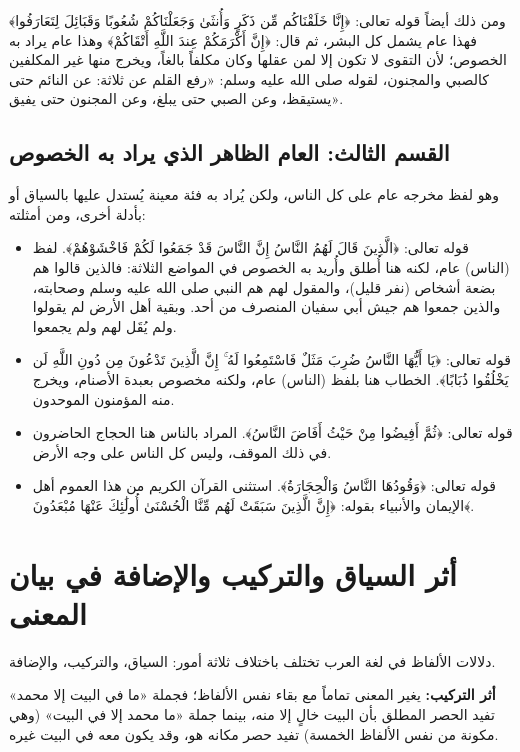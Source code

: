 ومن ذلك أيضاً قوله تعالى: ﴿إِنَّا خَلَقْنَاكُم مِّن ذَكَرٍ وَأُنثَىٰ وَجَعَلْنَاكُمْ شُعُوبًا وَقَبَائِلَ لِتَعَارَفُوا﴾ فهذا عام يشمل كل البشر، ثم قال: ﴿إِنَّ أَكْرَمَكُمْ عِندَ اللَّهِ أَتْقَاكُمْ﴾ وهذا عام يراد به الخصوص؛ لأن التقوى لا تكون إلا لمن عقلها وكان مكلفاً بالغاً، ويخرج منها غير المكلفين كالصبي والمجنون، لقوله صلى الله عليه وسلم: «رفع القلم عن ثلاثة: عن النائم حتى يستيقظ، وعن الصبي حتى يبلغ، وعن المجنون حتى يفيق».

\subsection{القسم الثالث: العام الظاهر الذي يراد به الخصوص}
وهو لفظ مخرجه عام على كل الناس، ولكن يُراد به فئة معينة يُستدل عليها بالسياق أو بأدلة أخرى، ومن أمثلته:
\begin{itemize}
    \item قوله تعالى: ﴿الَّذِينَ قَالَ لَهُمُ النَّاسُ إِنَّ النَّاسَ قَدْ جَمَعُوا لَكُمْ فَاخْشَوْهُمْ﴾. لفظ (الناس) عام، لكنه هنا أُطلق وأُريد به الخصوص في المواضع الثلاثة: فالذين قالوا هم بضعة أشخاص (نفر قليل)، والمقول لهم هم النبي صلى الله عليه وسلم وصحابته، والذين جمعوا هم جيش أبي سفيان المنصرف من أحد. وبقية أهل الأرض لم يقولوا ولم يُقَل لهم ولم يجمعوا.
    \item قوله تعالى: ﴿يَا أَيُّهَا النَّاسُ ضُرِبَ مَثَلٌ فَاسْتَمِعُوا لَهُ ۚ إِنَّ الَّذِينَ تَدْعُونَ مِن دُونِ اللَّهِ لَن يَخْلُقُوا ذُبَابًا﴾. الخطاب هنا بلفظ (الناس) عام، ولكنه مخصوص بعبدة الأصنام، ويخرج منه المؤمنون الموحدون.
    \item قوله تعالى: ﴿ثُمَّ أَفِيضُوا مِنْ حَيْثُ أَفَاضَ النَّاسُ﴾. المراد بالناس هنا الحجاج الحاضرون في ذلك الموقف، وليس كل الناس على وجه الأرض.
    \item قوله تعالى: ﴿وَقُودُهَا النَّاسُ وَالْحِجَارَةُ﴾. استثنى القرآن الكريم من هذا العموم أهل الإيمان والأنبياء بقوله: ﴿إِنَّ الَّذِينَ سَبَقَتْ لَهُم مِّنَّا الْحُسْنَىٰ أُولَٰئِكَ عَنْهَا مُبْعَدُونَ﴾.
\end{itemize}

\section{أثر السياق والتركيب والإضافة في بيان المعنى}
دلالات الألفاظ في لغة العرب تختلف باختلاف ثلاثة أمور: السياق، والتركيب، والإضافة.

\textbf{أثر التركيب:} 
يغير المعنى تماماً مع بقاء نفس الألفاظ؛ فجملة «ما في البيت إلا محمد» تفيد الحصر المطلق بأن البيت خالٍ إلا منه، بينما جملة «ما محمد إلا في البيت» (وهي مكونة من نفس الألفاظ الخمسة) تفيد حصر مكانه هو، وقد يكون معه في البيت غيره.

